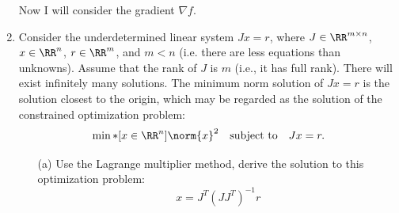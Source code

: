 \documentclass[11pt, oneside]{article}
\begin{document}
\begin{enumerate}
    Now I will consider the gradient $\nabla f$.

  \item %
    Consider the underdetermined linear system $Jx = r$, where
    $J \in \RR^{m \times n}$, $x \in \RR^n$, $r \in \RR^m$, and $m < n$
    (i.e. there are less equations than unknowns).
    Assume that the rank of $J$ is $m$ (i.e., it has full rank).
    There will exist infinitely many solutions.
    The minimum norm solution of $Jx = r$ is the solution closest to the origin,
    which may be regarded as the solution of the constrained optimization problem:
    \[
      \min*[x \in \RR^n]{\norm{x}^2} \quad \text{subject to} \quad Jx = r.
    \]
    \begin{enumerate}
      \item[(a)]
        Use the Lagrange multiplier method, derive the solution to this
        optimization problem:
        \[
          x = J^T (J J^T)^{-1} r
        \]


\end{enumerate}
\end{enumerate}
\end{document}
